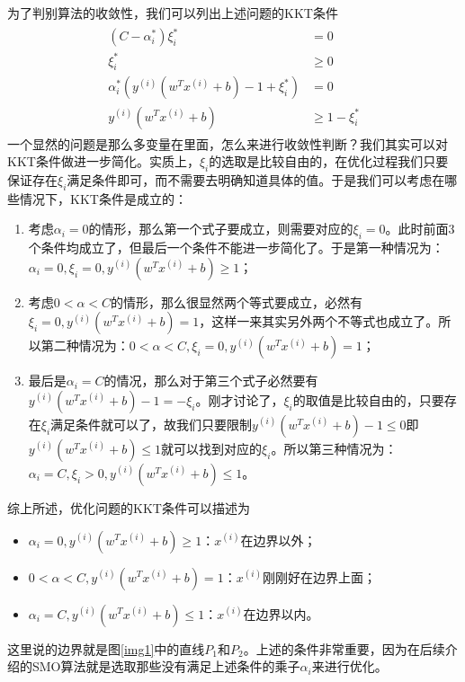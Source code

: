 \documentclass[11pt]{article}
\begin{document}
为了判别算法的收敛性，我们可以列出上述问题的KKT条件
\begin{align}
\begin{split}
(C-\alpha_i^*)\xi_i^* &= 0\\
\xi_i^* &\geq 0\\
\alpha_i^*\left(y^{(i)}(w^Tx^{(i)}+b)-1+\xi_i^* \right) &= 0\\
y^{(i)}(w^Tx^{(i)}+b)&\geq 1-\xi_i^*
\end{split}
\end{align}
一个显然的问题是那么多变量在里面，怎么来进行收敛性判断？我们其实可以对KKT条件做进一步简化。实质上，$\xi_i$的选取是比较自由的，在优化过程我们只要保证存在$\xi_i$满足条件即可，而不需要去明确知道具体的值。于是我们可以考虑在哪些情况下，KKT条件是成立的：
\begin{enumerate}
\item 考虑$\alpha_i = 0$的情形，那么第一个式子要成立，则需要对应的$\xi_i=0$。此时前面3个条件均成立了，但最后一个条件不能进一步简化了。于是第一种情况为：$\alpha_i=0, \xi_i=0, y^{(i)}(w^Tx^{(i)}+b)\geq 1$；
\item 考虑$0< \alpha< C$的情形，那么很显然两个等式要成立，必然有$\xi_i=0, y^{(i)}(w^Tx^{(i)}+b)=1$，这样一来其实另外两个不等式也成立了。所以第二种情况为：$0< \alpha< C, \xi_i=0, y^{(i)}(w^Tx^{(i)}+b) = 1$；
\item 最后是$\alpha_i = C$的情况，那么对于第三个式子必然要有$ y^{(i)}(w^Tx^{(i)}+b) -1=-\xi_i$。刚才讨论了，$\xi_i$的取值是比较自由的，只要存在$\xi_i$满足条件就可以了，故我们只要限制$y^{(i)}(w^Tx^{(i)}+b) -1\leq0$即$y^{(i)}(w^Tx^{(i)}+b)\leq1$就可以找到对应的$\xi_i$。所以第三种情况为：$\alpha_i=C, \xi_i>0, y^{(i)}(w^Tx^{(i)}+b) \leq 1$。
\end{enumerate}
综上所述，优化问题的KKT条件可以描述为
\begin{itemize}
\item $\alpha_i=0, y^{(i)}(w^Tx^{(i)}+b)\geq 1$：$x^{(i)}$在边界以外；
\item $0< \alpha< C, y^{(i)}(w^Tx^{(i)}+b) = 1$：$x^{(i)}$刚刚好在边界上面；
\item $\alpha_i=C, y^{(i)}(w^Tx^{(i)}+b) \leq 1$：$x^{(i)}$在边界以内。
\end{itemize}
这里说的边界就是图\ref{img1}中的直线$P_1$和$P_2$。上述的条件非常重要，因为在后续介绍的SMO算法就是选取那些没有满足上述条件的乘子$\alpha_i$来进行优化。
\end{document}

